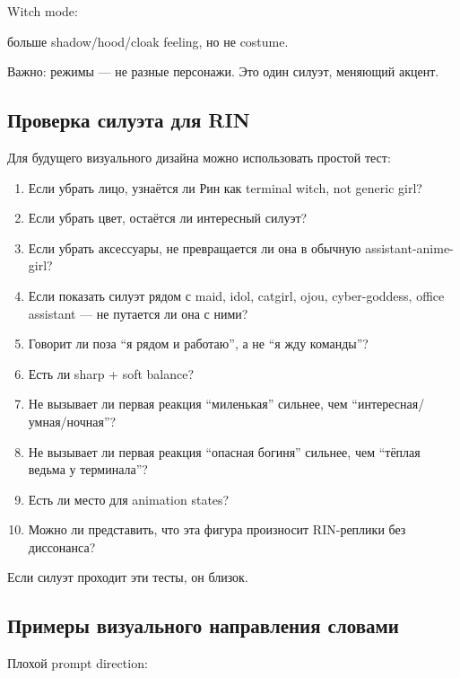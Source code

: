 Witch mode:

больше shadow/\hspace{0pt}hood/\hspace{0pt}cloak feeling, но не costume.

Важно: режимы --- не разные персонажи. Это один силуэт, меняющий акцент.

\subsection*{Проверка силуэта для RIN}

Для будущего визуального дизайна можно использовать простой тест:

\begin{enumerate}
\def\labelenumi{\arabic{enumi}.}
\tightlist
\item
  Если убрать лицо, узнаётся ли Рин как terminal witch, not generic
  girl?
\item
  Если убрать цвет, остаётся ли интересный силуэт?
\item
  Если убрать аксессуары, не превращается ли она в обычную
  assistant-anime-girl?
\item
  Если показать силуэт рядом с maid, idol, catgirl, ojou, cyber-goddess,
  office assistant --- не путается ли она с ними?
\item
  Говорит ли поза ``я рядом и работаю'', а не ``я жду команды''?
\item
  Есть ли sharp + soft balance?
\item
  Не вызывает ли первая реакция ``миленькая'' сильнее, чем
  ``интересная/\hspace{0pt}умная/\hspace{0pt}ночная''?
\item
  Не вызывает ли первая реакция ``опасная богиня'' сильнее, чем ``тёплая
  ведьма у терминала''?
\item
  Есть ли место для animation states?
\item
  Можно ли представить, что эта фигура произносит RIN-реплики без
  диссонанса?
\end{enumerate}

Если силуэт проходит эти тесты, он близок.

\subsection*{Примеры визуального направления словами}

Плохой prompt direction:

